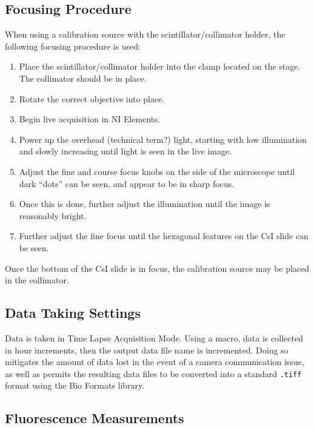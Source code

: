 \documentclass[11pt]{article}
\begin{document}
\subsection{Focusing Procedure}
When using a calibration source with the scintillator/collimator holder, the following focusing procedure is used:
\begin{enumerate}
\item Place the scintillator/collimator holder into the clamp located on the stage. The collimator should be in place. 
\item Rotate the correct objective into place. 
\item Begin live acquisition in NI Elements. 
\item Power up the overhead (technical term?) light, starting with low illumination and slowly increasing until light is seen in the live image. 
\item Adjust the fine and course focus knobs on the side of the microscope until dark ``dots'' can be seen, and appear to be in sharp focus. 
\item Once this is done, further adjust the illumination until the image is reasonably bright. 
\item Further adjust the fine focus until the hexagonal features on the CsI slide can be seen. 
\end{enumerate}
Once the bottom of the CsI slide is in focus, the calibration source may be placed in the collimator. 
\subsection{Data Taking Settings}
Data is taken in Time Lapse Acquisition Mode. Using a macro, data is collected in hour increments, then the output data file name is incremented. Doing so mitigates the 
amount of data lost in the event of a camera communication issue, as well as permits the resulting data files to be converted into a standard \verb+.tiff+ format using the Bio Formats library. 

\subsection{Fluorescence Measurements}
\end{document}
